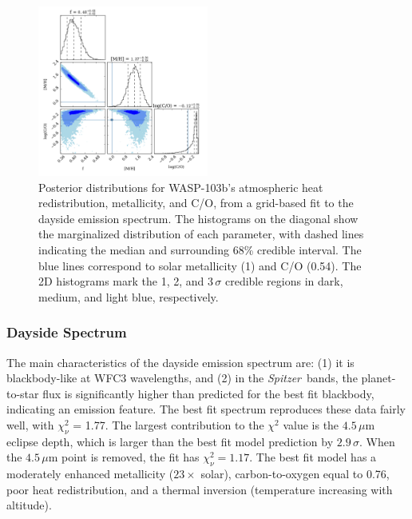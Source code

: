 \documentclass[twocolumn]{aastex61}
\newcommand{\project}[1]{\textsl{#1}}
\newcommand{\Spitzer}{\project{Spitzer}}
\begin{document}
\begin{figure}
\includegraphics[width = 0.5\textwidth]{Figures/WASP-103b_grid_DAYSIDE_stair_pairs_02.pdf}
\caption{Posterior distributions for WASP-103b's atmospheric heat redistribution, metallicity, and C/O, from a grid-based fit to the dayside emission spectrum. The histograms on the diagonal show the marginalized distribution of each parameter, with dashed lines indicating the median and surrounding 68\% credible interval. The blue lines correspond to solar metallicity (1) and C/O (0.54). The 2D histograms mark the 1, 2, and 3$\,\sigma$ credible regions in dark, medium, and light blue, respectively.}
\label{fig:composition}
\end{figure}

\subsubsection{Dayside Spectrum}
The main characteristics of the dayside emission spectrum are: (1) it is blackbody-like at WFC3 wavelengths, and (2) in the \Spitzer\ bands, the planet-to-star flux is significantly higher than predicted for the best fit blackbody, indicating an emission feature.  The best fit spectrum reproduces these data fairly well, with $\chi^2_\nu$ = 1.77. The largest contribution to the $\chi^2$ value is the $4.5\,\mu$m eclipse depth, which is larger than the best fit model prediction by $2.9\,\sigma$. When the $4.5\,\mu$m point is removed, the fit has $\chi^2_\nu = 1.17$.  The best fit model has a moderately enhanced metallicity ($23\times$ solar), carbon-to-oxygen equal to 0.76, poor heat redistribution, and a thermal inversion (temperature increasing with altitude).
\end{document}
